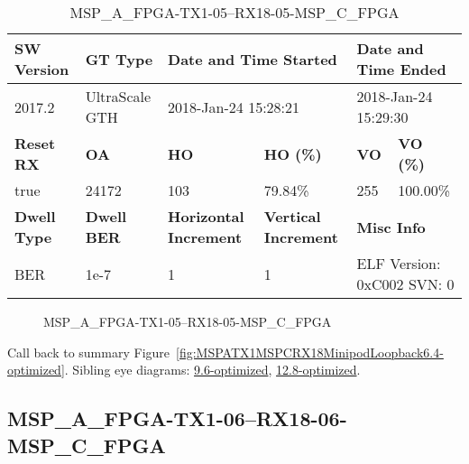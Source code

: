 \begin{table}[h]
\centering
\caption{MSP\_A\_FPGA-TX1-05--RX18-05-MSP\_C\_FPGA}
\label{tab:MSPAFPGATX105RX1805MSPCFPGA6.4-optimized}
\begin{tabular}{@{}|l|l|l|l|l|l|@{}}
\toprule
\textbf{SW Version}                & \textbf{GT Type}   & \multicolumn{2}{l|}{\textbf{Date and Time Started}}            & \multicolumn{2}{l|}{\textbf{Date and Time Ended}}        \\ \midrule
2017.2                       & UltraScale GTH          & \multicolumn{2}{l|}{2018-Jan-24 15:28:21}                   & \multicolumn{2}{l|}{2018-Jan-24 15:29:30}               \\ \midrule
\textbf{Reset RX}                  & \textbf{OA} & \textbf{HO}   & \textbf{HO (\%)} & \textbf{VO} & \textbf{VO (\%)} \\ \midrule
true & 24172        & 103          & 79.84\%        & 255        & 100.00\%       \\ \midrule
\textbf{Dwell Type}                & \textbf{Dwell BER} & \textbf{Horizontal Increment} & \textbf{Vertical Increment}    & \multicolumn{2}{l|}{\textbf{Misc Info}}                  \\ \midrule
BER                            & 1e-7        & 1        & 1           & \multicolumn{2}{l|}{ELF Version: 0xC002 SVN: 0}                         \\ \bottomrule
\end{tabular}
\end{table}

\begin{figure}[h]
\caption{MSP\_A\_FPGA-TX1-05--RX18-05-MSP\_C\_FPGA} \label{fig:MSPAFPGATX105RX1805MSPCFPGA6.4-optimized}
\end{figure}

Call back to summary Figure~\ref{fig:MSPATX1MSPCRX18MinipodLoopback6.4-optimized}.
Sibling eye diagrams: \hyperref[sec:MSPAFPGATX105RX1805MSPCFPGA9.6-optimized]{9.6-optimized}, \hyperref[sec:MSPAFPGATX105RX1805MSPCFPGA12.8-optimized]{12.8-optimized}.

\clearpage
\newpage


\subsection{MSP\_A\_FPGA-TX1-06--RX18-06-MSP\_C\_FPGA}\label{sec:MSPAFPGATX106RX1806MSPCFPGA6.4-optimized}

